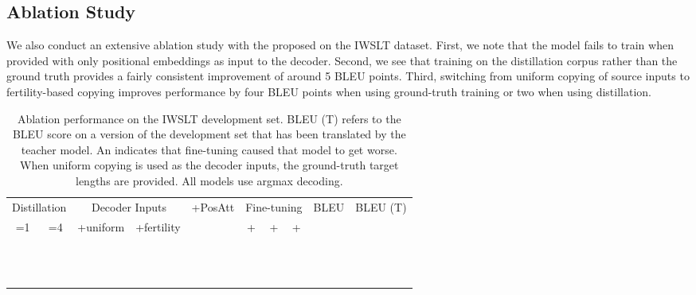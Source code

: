 \documentclass{article} \usepackage{iclr2018_conference,times}
\begin{document}
\subsection{Ablation Study}
We also conduct an extensive ablation study with the proposed \model{} on the IWSLT dataset. First, we note that the model fails to train when provided with only positional embeddings as input to the decoder. Second, we see that training on the distillation corpus rather than the ground truth provides a fairly consistent improvement of around 5 BLEU points. Third, switching from uniform copying of source inputs to fertility-based copying improves performance by four BLEU points when using ground-truth training or two when using distillation.



\begin{table}[h!]
\small\centering
\begin{tabular}{cc|ccc|ccc|rr}
\toprule
\multicolumn{2}{c|}{Distillation}  & 
\multicolumn{2}{c}{Decoder Inputs} & 
\multirow{2}[2]{*}{+PosAtt}  & 
\multicolumn{3}{|c|}{Fine-tuning} & 
\multirow{2}[2]{*}{BLEU} & 
\multirow{2}[2]{*}{BLEU (T)}\\
           
=1 &
=4 &
+uniform & 
\multicolumn{1}{c}{+fertility} 
& 
& 
\multicolumn{1}{|c}{+}  & 
+ & 
+ &   &\\

\midrule 
& &              &              &   & & & &  \\
& &  &              &   & & & & \\
& &              &  &   & & & & \\
\midrule


&  &  &              &   & & & & \\
&  &  &              &   & & & &  \\
&  &              &  &               & & & &  &  \\
&  &              &  &   & & & &  &  \\
\midrule
&  &  &  & &  &  & &  \\
&  &              &  &   & & &  &  & \\
&  &              &  &   & &  & &  & \\
&  &              &  &   &  &  &  &  & \\
&  &              &  &   &  &  &  &  & \\
\bottomrule
\end{tabular}
\caption{Ablation performance on the IWSLT development set. BLEU (T) refers to the BLEU score on a version of the development set that has been translated by the teacher model. An  indicates that fine-tuning caused that model to get worse. When uniform copying is used as the decoder inputs, the ground-truth target lengths are provided. All models use argmax decoding.}
\end{table}
\end{document}
